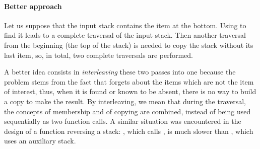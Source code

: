 \paragraph{Better approach}

Let us suppose that the input stack contains the item at the
bottom. Using  to find it leads to a complete traversal of
the input stack. Then another traversal from the beginning (the top of
the stack) is needed to copy the stack without its last item, so, in
total, two complete traversals are performed.

A better idea consists in \emph{interleaving} these two passes into
one because the problem stems from the fact that  forgets
about the items which are not the item of interest, thus, when it is
found or known to be absent, there is no way to build a copy to make
the result. By interleaving, we mean that during the traversal, the
concepts of membership and of copying are combined, instead of being
used sequentially as two function calls. A similar situation was
encountered in the design of a function reversing a stack:
, which calls , is much slower than
, which uses an auxiliary stack.

